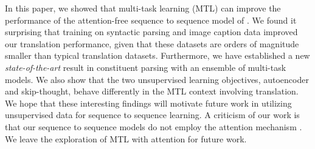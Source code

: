 
In this paper, we showed that multi-task learning (MTL) can improve the
performance of the attention-free sequence to sequence model of
\citep{sutskever14}.  We found it surprising that training on syntactic
parsing and image caption data improved our translation performance, given
that these 
datasets are orders of magnitude smaller than typical translation
datasets. 
Furthermore, we have established a new {\it state-of-the-art} result in
constituent parsing with an ensemble of multi-task models.
We also show that the two unsupervised
learning objectives, autoencoder and skip-thought, behave differently in the MTL context
involving translation. We hope that these interesting
findings will motivate future work in utilizing unsupervised data for sequence
to sequence learning.
A criticism of our work is that our sequence to sequence models do not employ
the attention mechanism \citep{bog15}.  We leave the exploration
of MTL with attention for future work.



